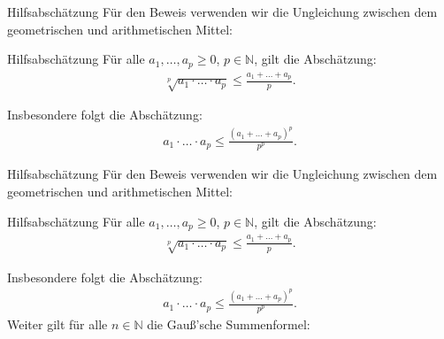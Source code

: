\documentclass[10pt]{beamer}
\def\bN{\mathbb{N}}
\begin{document}
\begin{frame}{Hilfsabschätzung}
    Für den Beweis verwenden wir die Ungleichung zwischen dem geometrischen und arithmetischen Mittel:
    \begin{block}{Hilfsabschätzung}
        Für alle \( a_{1}, \ldots, a_{p} \geq 0 \), \( p \in \bN \), gilt die Abschätzung:
        \begin{align*}
            \sqrt[p]{a_{1} \cdot \ldots \cdot a_{p}} 
            \leq \frac{a_{1} + \ldots + a_{p}}{p}.
        \end{align*}
    \end{block}
    Insbesondere folgt die Abschätzung:
    \begin{align*}
        a_{1} \cdot \ldots \cdot a_{p} 
        \leq \frac{\left( a_{1} + \ldots + a_{p} \right)^{p}}{p^{p}}.
    \end{align*}
\end{frame}



\begin{frame}{Hilfsabschätzung}
    Für den Beweis verwenden wir die Ungleichung zwischen dem geometrischen und arithmetischen Mittel:
    \begin{block}{Hilfsabschätzung}
        Für alle \( a_{1}, \ldots, a_{p} \geq 0 \), \( p \in \bN \), gilt die Abschätzung:
        \begin{align*}
            \sqrt[p]{a_{1} \cdot \ldots \cdot a_{p}} 
            \leq \frac{a_{1} + \ldots + a_{p}}{p}.
        \end{align*}
    \end{block}
    Insbesondere folgt die Abschätzung:
    \begin{align*}
        a_{1} \cdot \ldots \cdot a_{p} 
        \leq \frac{\left( a_{1} + \ldots + a_{p} \right)^{p}}{p^{p}}.
    \end{align*}
    Weiter gilt für alle \( n \in \bN \) die Gauß'sche Summenformel:   
\end{frame}
\end{document}
